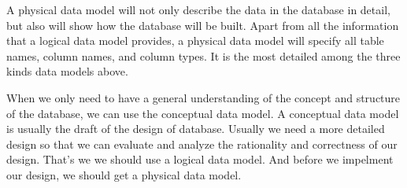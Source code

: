\documentclass[12pt, a4paper]{article}
\begin{document}
A physical data model will not only describe the data in the database in detail, but also will show how the database will be built. Apart from all the information that a logical data model provides, a physical data model will specify all table names, column names, and column types. It is the most detailed among the three kinds data models above.

When we only need to have a general understanding of the concept and structure of the database, we can use the conceptual data model. A conceptual data model is usually the draft of the design of database. Usually we need a more detailed design so that we can evaluate and analyze the rationality and correctness of our design. That's we we should use a logical data model. And before we impelment our design, we should get a physical data model.


\end{document}
